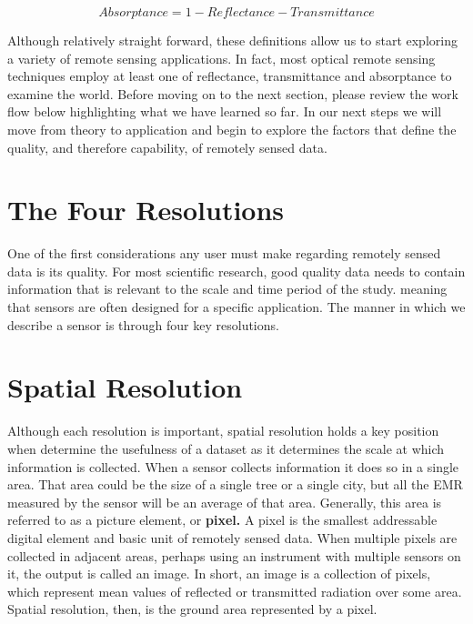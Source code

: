 \documentclass[
]{book}
\begin{document}
\begin{equation}
Absorptance = 1 - Reflectance - Transmittance 
\label{eq:absorptance}
\end{equation}

Although relatively straight forward, these definitions allow us to
start exploring a variety of remote sensing applications. In fact, most
optical remote sensing techniques employ at least one of reflectance,
transmittance and absorptance to examine the world. Before moving on to
the next section, please review the work flow below highlighting what we
have learned so far. In our next steps we will move from theory to
application and begin to explore the factors that define the quality,
and therefore capability, of remotely sensed data.

\hypertarget{the-four-resolutions}{%
\section{The Four Resolutions}\label{the-four-resolutions}}

One of the first considerations any user must make regarding remotely
sensed data is its quality. For most scientific research, good quality
data needs to contain information that is relevant to the scale and time
period of the study. meaning that sensors are often designed for a
specific application. The manner in which we describe a sensor is
through four key resolutions.

\hypertarget{spatial-resolution}{%
\section{Spatial Resolution}\label{spatial-resolution}}

Although each resolution is important, spatial resolution holds a key
position when determine the usefulness of a dataset as it determines the
scale at which information is collected. When a sensor collects
information it does so in a single area. That area could be the size of
a single tree or a single city, but all the EMR measured by the sensor
will be an average of that area. Generally, this area is referred to as
a picture element, or \textbf{pixel.} A pixel is the smallest addressable
digital element and basic unit of remotely sensed data. When multiple
pixels are collected in adjacent areas, perhaps using an instrument with
multiple sensors on it, the output is called an image. In short, an
image is a collection of pixels, which represent mean values of
reflected or transmitted radiation over some area. Spatial
resolution, then, is the ground area represented by a pixel.
\end{document}

